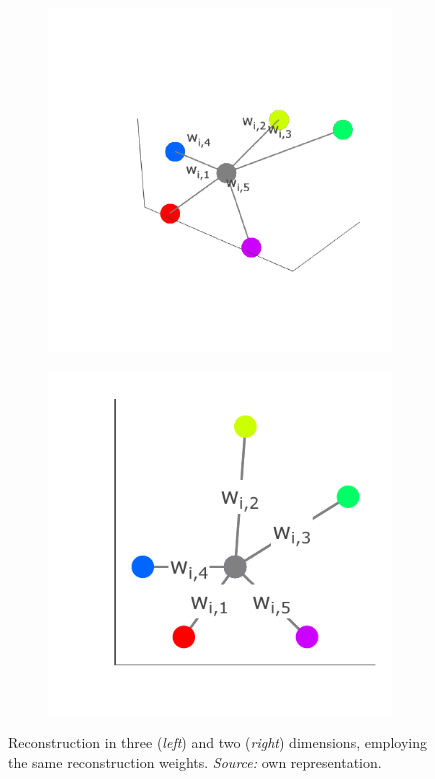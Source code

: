 \begin{figure}[H]
 \centering
 \begin{subfigure}[b]{0.48\textwidth}
   \centering
   \includegraphics[width = \textwidth]{figures/reconstruction-3d}
 \end{subfigure}
 \hfill
 \begin{subfigure}[b]{0.48\textwidth}
   \centering
   \includegraphics[width = \textwidth]{figures/reconstruction-2d}
 \end{subfigure}
  \caption[Linear reconstruction in LLE]{Reconstruction in three (\textit{left}) 
  and two (\textit{right}) 
  dimensions, employing the same reconstruction weights. \textit{Source:} own
  representation.}
  \label{fig-reconstruction}
\end{figure}

